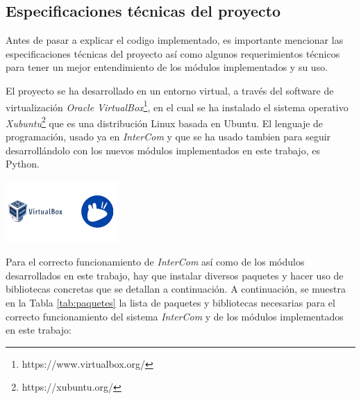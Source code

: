 \label{sec:metodologia}

\subsection{Especificaciones técnicas del proyecto}

Antes de pasar a explicar el codigo implementado, es importante mencionar las especificaciones técnicas del proyecto así como algunos requerimientos técnicos para tener un mejor entendimiento de los módulos implementados y su uso. 
\vspace{\baselineskip}

El proyecto se ha desarrollado en un entorno virtual, a través del software de virtualización \textit{Oracle VirtualBox}\footnote{https://www.virtualbox.org/}, en el cual se ha instalado el sistema operativo \textit{Xubuntu}\footnote{https://xubuntu.org/} que es una distribución Linux basada en Ubuntu. El lenguaje de programación, usado ya en \textit{InterCom} y que se ha usado tambien para seguir desarrollándolo con los nuevos módulos implementados en este trabajo, es Python. 
\vspace{\baselineskip}

\begin{center}
	\includegraphics[width = 0.32\textwidth]{images/oracle_xubuntu.png}
	\label{fig:oraclexubuntu}
\end{center}

\vspace{\baselineskip}

Para el correcto funcionamiento de \textit{InterCom} así como de los módulos desarrollados en este trabajo, hay que instalar diversos paquetes y hacer uso de bibliotecas concretas que se detallan a continuación. A continuación, se muestra en la Tabla \ref{tab:paquetes} la lista de paquetes y bibliotecas necesarias para el correcto funcionamiento del sistema \textit{InterCom} y de los módulos implementados en este trabajo:
\vspace{\baselineskip}

